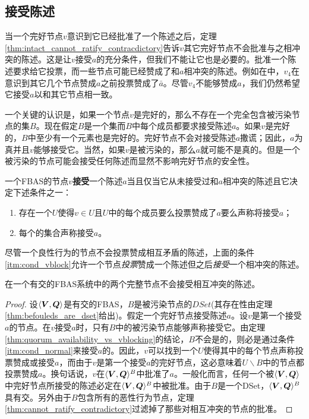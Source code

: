 \subsection{接受陈述}

当一个完好节点$v$意识到它已经批准了一个陈述之后，定理\ref{thm:intact_cannot_ratify_contracdictory}告诉$v$其它完好节点不会批准与之相冲突的陈述。这是让$v$接受$a$的充分条件，但我们不能让它也是必要的。批准一个陈述要求给它投票，而一些节点可能已经赞成了和$a$相冲突的陈述。例如在中，$v_4$在意识到其它几个节点赞成$a$之前投票赞成了$\bar a$。尽管$v_4$不能够赞成$a$，我们仍然希望它接受$a$以和其它节点相一致。

一个关键的认识是，如果一个节点$v$是完好的，那么不存在一个完全包含被污染节点的{\vblock}集$B$。现在假定$B$是一个{\vblock}集而$B$中每个成员都要求接受陈述$a$。如果$v$是完好的，$B$中至少有一个元素也是完好的。完好节点不会对接受陈述$a$撒谎；因此，$a$为真并且$v$能够接受它。当然，如果$v$是被污染的，那么$a$就可能不是真的。但是一个被污染的节点可能会接受任何陈述而显然不影响完好节点的安全性。

\begin{definition}[接受]
        一个FBAS的节点$v$\textbf{接受}一个陈述$a$当且仅当它从未接受过和$a$相冲突的陈述且它决定下述条件之一：
        \begin{enumerate}
                \item\label{itm:cond_normal} 存在一个{\quorum}$U$使得$v\in U$且$U$中的每个成员要么投票赞成了$a$要么声称将接受$a$；
                \item\label{itm:cond_vblock} 每个{\vblock}的集合声称接受$a$。 
        \end{enumerate}
\end{definition}

尽管一个良性行为的节点不会投票赞成相互矛盾的陈述，上面的条件\ref{itm:cond_vblock}允许一个节点\textit{投票}赞成一个陈述但之后\textit{接受}一个相冲突的陈述。

\begin{theorem}\label{thm:intact_cannot_accept_contradictory}
        在一个有{\quorum}交的FBAS系统中的两个完整节点不会接受相互冲突的陈述。
\end{theorem}

\begin{proof}
        设$\langle{\bm V},{\bm Q}\rangle$是有{\quorum}交的FBAS，$B$是被污染节点的$DSet$(其存在性由定理\ref{thm:befouleds_are_dset}给出)。假定一个完好节点接受陈述$a$。设$v$是第一个接受$a$的节点。在$v$接受$a$时，只有$B$中的被污染节点能够声称接受它。由定理\ref{thm:quorum_availability_vs_vblocking}的结论，$B$不会是{\vblock}的，则必是通过条件\ref{itm:cond_normal}来接受$a$的。因此，$v$可以找到一个{\quorum}$U$使得其中的每个节点声称投票赞成或接受$a$，而由于$v$是第一个接受$a$的完好节点，这必意味着$U\backslash B$中的节点都投票赞成$a$。换句话说，$v$在$\langle{\bm V},{\bm Q}\rangle^{B}$中批准了$a$。一般化而言，任何一个被$\langle{\bm V},{\bm Q}\rangle$中完好节点所接受的陈述必定在$\langle{\bm V},{\bm Q}\rangle^{B}$中被批准。由于$B$是一个DSet，$\langle{\bm V},{\bm Q}\rangle^{B}$具有{\quorum}交。另外由于$B$包含所有的恶性行为节点，定理\ref{thm:cannot_ratify_contradictory}过滤掉了那些对相互冲突的节点的批准。
\end{proof}